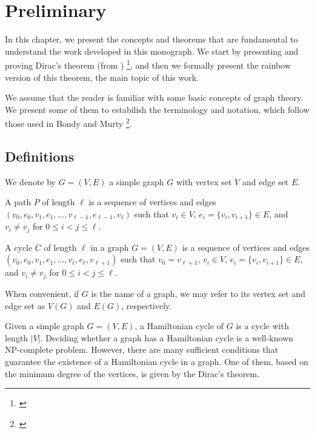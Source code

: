 
\chapter{Preliminary}

In this chapter, we present the concepts and theorems that are fundamental to understand the 
work developed in this monograph. We start by presenting and proving Dirac's theorem (from \citeyear{dirac1952}) 
\footnote{\cite{dirac1952}}, 
and then we formally present the rainbow version of this theorem, the main topic of this work.

We assume that the reader is familiar with some basic concepts of graph theory. We present some 
of them to estabilish the terminology and notation, which follow those used in Bondy and Murty 
\footnote{\cite{bondy1976}}.

\section{Definitions}

We denote by $G = (V, E)$ a simple graph $G$ with vertex set $V$ and edge set $E$.

A path $P$ of length $\ell$ is a sequence of vertices and edges $(v_0, e_0, v_1, e_1, \ldots, v_{\ell - 1}, e_{\ell - 1}, v_{\ell})$ such that
$v_i \in V$, $e_i = \{v_i, v_{i + 1}\} \in E$, and $v_i \neq v_j$ for $0 \leq i < j \leq \ell$.

A cycle $C$ of length $\ell$ in a graph $G = (V, E)$ is a sequence of vertices and edges $(v_0, e_0, v_1, e_1, \ldots, v_{\ell}, e_{\ell}, v_{\ell + 1})$ such that
$v_{0} = v_{\ell + 1}$, $v_i \in V$, $e_i = \{v_i, v_{i + 1}\} \in E$, and $v_i \neq v_j$ for $0 \leq i < j \leq \ell$.

When convenient, if $G$ is the name of a graph, we may refer to its vertex set and edge set as $V(G)$ and $E(G)$, respectively.

Given a simple graph $G = (V, E)$, a Hamiltonian cycle of $G$ is a cycle with length $|V|$.
Deciding whether a graph has a Hamiltonian cycle is a well-known NP-complete problem. 
However, there are many sufficient conditions that guarantee the existence of a Hamiltonian cycle in a graph. 
One of them, based on the minimum degree of the vertices, is given by the Dirac's theorem.

